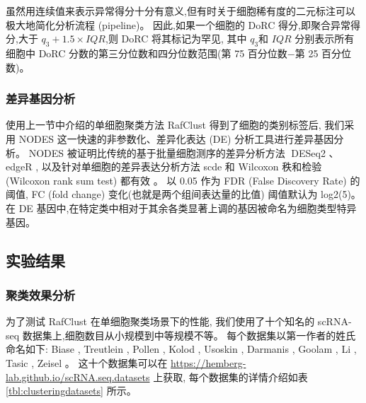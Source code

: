 虽然用连续值来表示异常得分十分有意义,但有时关于细胞稀有度的二元标注可以极大地简化分析流程 (pipeline)。
因此,如果一个细胞的 DoRC 得分,即聚合异常得分,大于 $q_3 + 1.5 \times IQR$,则 DoRC 将其标记为罕见,
其中 $q_3$和 $IQR$ 分别表示所有细胞中 DoRC 分数的第三分位数和四分位数范围(第 75 百分位数$-$第 25 百分位数)。

\subsubsection{差异基因分析}
\label{subsec:de}

使用上一节中介绍的单细胞聚类方法 RafClust 得到了细胞的类别标签后,
我们采用 NODES \cite{Sengupta049734} 这一快速的非参数化、差异化表达 (DE) 分析工具进行差异基因分析。
NODES 被证明比传统的基于批量细胞测序的差异分析方法 DESeq2 \cite{love2014moderated}、edgeR \cite{robinson2010edger},
以及针对单细胞的差异表达分析方法 scde \cite{kharchenko2014bayesian} 和 Wilcoxon 秩和检验 (Wilcoxon rank sum test) 都有效 \cite{Sengupta049734}。
以 0.05 作为 FDR (False Discovery Rate) 的阈值, FC (fold change) 变化(也就是两个组间表达量的比值) 阈值默认为 log2(5)。
在 DE 基因中,在特定类中相对于其余各类显著上调的基因被命名为细胞类型特异基因。

\subsection{实验结果}

\subsubsection{聚类效果分析}

为了测试 RafClust 在单细胞聚类场景下的性能,
我们使用了十个知名的 scRNA-seq 数据集上,细胞数目从小规模到中等规模不等。
每个数据集以第一作者的姓氏命名如下: 
Biase \cite{biase2014cell},
Treutlein \cite{treutlein2014reconstructing}, 
Pollen \cite{pollen2014low}, 
Kolod \cite{kolodziejczyk2015single}, 
Usoskin \cite{usoskin2015unbiased}, 
Darmanis \cite{darmanis2015survey}, 
Goolam \cite{goolam2016heterogeneity}, 
Li \cite{li2017reference},
Tasic \cite{tasic2016adult}, 
Zeisel \cite{zeisel2015cell}。
这十个数据集可以在 \url{https://hemberg-lab.github.io/scRNA.seq.datasets} 上获取, 
每个数据集的详情介绍如表 \ref{tbl:clusteringdatasets} 所示。

